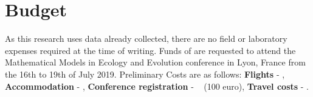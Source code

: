\documentclass[11pt,usenames,dvipsnames]{article}
\begin{document}
\section{Budget}
As this research uses data already collected, there are no field or laboratory expenses required at the time of writing. Funds of  are requested to attend the Mathematical Models in Ecology and Evolution conference in Lyon, France from the 16th to 19th of July 2019. Preliminary Costs are as follows: \textbf{Flights} - , \textbf{Accommodation} - , \textbf{Conference registration} - ~ (100 euro), \textbf{Travel costs} - .
\end{document}
